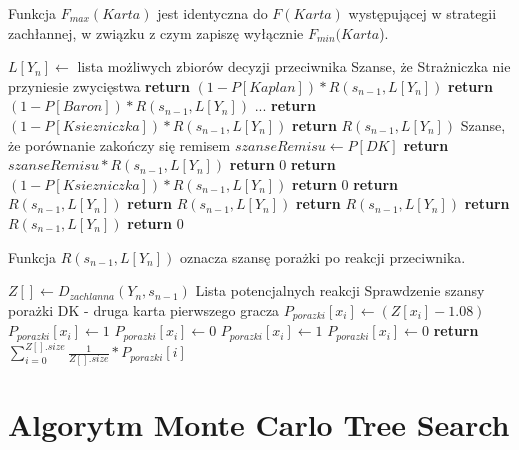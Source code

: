 Funkcja $F_{max}(Karta)$ jest identyczna do $F(Karta)$ występującej w strategii zachłannej, w związku z czym zapiszę wyłącznie $F_{min}(Karta$).
\begin{algorithmic}[1]
		\State $L[Y_n] \gets$ lista możliwych zbiorów decyzji przeciwnika 
			 \Comment Szanse, że Strażniczka nie przyniesie zwycięstwa
				\State \textbf{return} $ (1 - P[Kaplan]) * R(s_{n-1}, L[Y_n]) $
			\EndCase
				\State \textbf{return} $ (1 - P[Baron]) * R(s_{n-1}, L[Y_n]) $
			\EndCase
				\State ...
				\State \textbf{return} $ (1 - P[Ksiezniczka]) * R(s_{n-1}, L[Y_n]) $
			\EndCase
				\State \textbf{return} $  R(s_{n-1}, L[Y_n]) $
			\EndCase
				\Comment Szanse, że porównanie zakończy się remisem 
				\State $ szanseRemisu \gets P[DK]$ 
				\State \textbf{return} $ szanseRemisu * R(s_{n-1}, L[Y_n]) $
			\EndCase
				\State \textbf{return} $ 0 $
			\EndCase
				\State \textbf{return} $ (1 - P[Ksiezniczka]) * R(s_{n-1}, L[Y_n]) $
			\EndCase
					\State \textbf{return} $ 0 $
				\Else
					\State \textbf{return} $ R(s_{n-1}, L[Y_n]) $
				\EndIf
			\EndCase
				\State \textbf{return} $ R(s_{n-1}, L[Y_n]) $
			\EndCase
				\State \textbf{return} $ R(s_{n-1}, L[Y_n]) $
			\EndCase
				\State \textbf{return} $ R(s_{n-1}, L[Y_n]) $
			\EndCase
			\State \textbf{return} $ 0 $
			\EndCase
		\EndSwitch
	\EndFunction
\end{algorithmic}

Funkcja $R(s_{n-1}, L[Y_n])$ oznacza szansę porażki po reakcji przeciwnika.
\begin{algorithmic}[1]
			\State $Z[] \gets D_{zachlanna}(Y_n, s_{n-1}) $	\Comment Lista potencjalnych reakcji
		\EndFor
			\Comment Sprawdzenie szansy porażki
					\Comment DK - druga karta pierwszego gracza
					\State $P_{porazki}[x_i] \gets (Z[x_i] - 1.08)$
				\EndCase
						\State $P_{porazki}[x_i] \gets 1$
					\Else
						\State $P_{porazki}[x_i] \gets 0$
					\EndIf
				\EndCase
						\State $P_{porazki}[x_i] \gets 1$
					\Else
						\State $P_{porazki}[x_i] \gets 0$
					\EndIf
				\EndCase
			\EndSwitch
		\EndFor
		\State \textbf{return} $ \sum_{i=0}^{Z[].size} \frac{1}{Z[].size} * P_{porazki}[i] $
	\EndFunction
\end{algorithmic}
\section{Algorytm Monte Carlo Tree Search}
\label{sec:algMCTS}